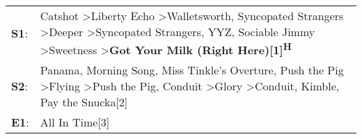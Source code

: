 \begin{supertabular}{p{0.03\textwidth}p{0.92\textwidth}}
 \textbf{S1}:  &  Catshot\textsuperscript{} \textgreater \enspace Liberty Echo\textsuperscript{} \textgreater \enspace Walletsworth\textsuperscript{}, \enspace Syncopated Strangers\textsuperscript{} \textgreater \enspace Deeper\textsuperscript{} \textgreater \enspace Syncopated Strangers\textsuperscript{}, \enspace YYZ\textsuperscript{}, \enspace Sociable Jimmy\textsuperscript{} \textgreater \enspace Sweetness\textsuperscript{} \textgreater \enspace \textbf{Got Your Milk (Right Here)[1]\textsuperscript{H}}  \enspace  \\
 \textbf{S2}:  &                           Panama\textsuperscript{}, \enspace Morning Song\textsuperscript{}, \enspace Miss Tinkle's Overture\textsuperscript{}, \enspace Push the Pig\textsuperscript{} \textgreater \enspace Flying\textsuperscript{} \textgreater \enspace Push the Pig\textsuperscript{}, \enspace Conduit\textsuperscript{} \textgreater \enspace Glory\textsuperscript{} \textgreater \enspace Conduit\textsuperscript{}, \enspace Kimble\textsuperscript{}, \enspace Pay the Snucka[2]\textsuperscript{}  \enspace  \\
 \textbf{E1}:  &                                                                                                                                                                                                                                                                                                                                                                                                                                                                               All In Time[3]\textsuperscript{}  \enspace  \\
\end{supertabular}
